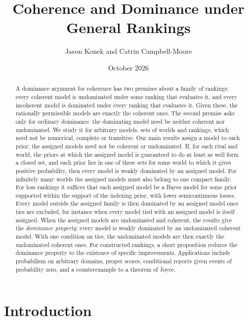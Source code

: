 \documentclass[11pt]{article}
\title{Coherence and Dominance under General Rankings}
\author{Jason Konek and Catrin Campbell-Moore}
\date{October 2026}
\theoremstyle{definition}
\theoremstyle{remark}
\begin{document}
\maketitle

\begin{abstract}
A dominance argument for coherence has two premises about a family of rankings: every coherent model is undominated under some ranking that evaluates it, and every incoherent model is dominated under every ranking that evaluates it. Given these, the rationally permissible models are exactly the coherent ones. The second premise asks only for ordinary dominance: the dominating model need be neither coherent nor undominated. We study it for arbitrary models, sets of worlds and rankings, which need not be numerical, complete or transitive. Our main results assign a model to each prior; the assigned models need not be coherent or undominated. If, for each rival and world, the priors at which the assigned model is guaranteed to do at least as well form a closed set, and each prior lies in one of these sets for some world to which it gives positive probability, then every model is weakly dominated by an assigned model. For infinitely many worlds the assigned models must also belong to one compact family. For loss rankings it suffices that each assigned model be a Bayes model for some prior supported within the support of the indexing prior, with lower semicontinuous losses. Every model outside the assigned family is then dominated by an assigned model once ties are excluded, for instance when every model tied with an assigned model is itself assigned. When the assigned models are undominated and coherent, the results give the \emph{dominance property}: every model is weakly dominated by an undominated coherent model. With one condition on ties, the undominated models are then exactly the undominated coherent ones. For constructed rankings, a short proposition reduces the dominance property to the existence of specific improvements. Applications include probabilism on arbitrary domains, proper scores, conditional reports given events of probability zero, and a counterexample to a theorem of Joyce.
\end{abstract}

\section{Introduction}\label{sec:intro}
\end{document}
